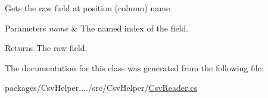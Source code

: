 Gets the raw field at position (column) name. 


\begin{DoxyParams}{Parameters}
{\em name} & The named index of the field.\\
\hline
\end{DoxyParams}
\begin{DoxyReturn}{Returns}
The raw field.
\end{DoxyReturn}


The documentation for this class was generated from the following file\-:\begin{DoxyCompactItemize}
\item 
packages/\-Csv\-Helper..../src/\-Csv\-Helper/\hyperlink{a00203}{Csv\-Reader.\-cs}\end{DoxyCompactItemize}
